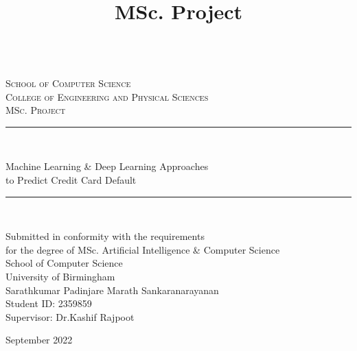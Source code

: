 \documentclass[twoside,11pt,a4paper]{article}
\title{MSc. Project\\\bhamthesistitle}
\author{\textsf{\bhamstudentname {\textsf{}}}}
\date{}
\newcommand{\bhamstudentname}{Sarathkumar Padinjare Marath Sankaranarayanan}
\newcommand{\bhamfronttitle}{Machine Learning \& Deep Learning Approaches \\ to Predict Credit Card Default}
\newcommand{\bhamschool}{School of Computer Science}
\newcommand{\bhamcollege}{Engineering and Physical Sciences}
\newcommand{\bhamdegree}{MSc. Artificial Intelligence \& Computer Science}
\newcommand{\bhamid}{2359859}
\newcommand{\bhamsupervisor}{Dr.Kashif Rajpoot}
\newcommand{\bhamyear}{2022}
\newcommand{\HRule}{\rule{\linewidth}{0.5mm}}
\begin{document}
\begin{titlepage}
\begin{center}
\begin{minipage}{6in}
  \centering
  \hspace*{.2in}
  \end{minipage}
  \\ [1.0cm]
\textsc{{\LARGE \bhamschool\\}College of \bhamcollege}\\[3.5cm]

\textsc{\Large MSc. Project}\\[0.5cm]

\HRule \\[0.4cm]
\begin{center}\Huge
\bhamfronttitle
\end{center}
\HRule \\[1.5cm]

\begin{center}
Submitted in conformity with the requirements\\ for the degree of \bhamdegree\\
\bhamschool\\ University of Birmingham\\
\vspace{2cm}
\bhamstudentname \\
Student ID: \bhamid\\
Supervisor: \bhamsupervisor      
\end{center}
\vfill

{\large September \bhamyear}

\end{center}
\end{titlepage}
\end{document}
